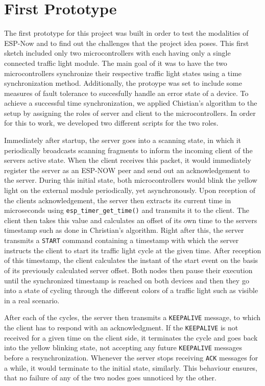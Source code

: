 \section{First Prototype}

The first prototype for this project was built in order to test the modalities of ESP-Now and to find out the challenges that the project idea poses. 
This first sketch included only two microcontrollers with each having only a single connected traffic light module. 
The main goal of it was to have the two microcontrollers synchronize their respective traffic light states using a time synchronization method.
Additionally, the protoype was set to include some measures of fault tolerance to succesfully handle an error state of a device. 
To achieve a successful time synchronization, we applied Chistian's algorithm to the setup by assigning the roles of server and client to the microcontrollers. 
In order for this to work, we developed two different scripts for the two roles. 

Immediately after startup, the server goes into a scanning state, in which it periodically broadcasts scanning fragments to inform the incoming client of the servers active state. 
When the client receives this packet, it would immediately register the server as an ESP-NOW peer and send out an acknowledgement to the server. 
During this initial state, both microcontrollers would blink the yellow light on the external module periodically, yet asynchronously.
Upon reception of the clients acknowledgement, the server then extracts its current time in microseconds using \texttt{esp\_timer\_get\_time()} and transmits it to the client.
The client then takes this value and calculates an offset of its own time to the servers timestamp such as done in Christian's algorithm. 
Right after this, the server transmits a \texttt{START} command containing a timestamp with which the server instructs the client to start its traffic light cycle at the given time. 
After reception of this timestamp, the client calculates the instant of the start event on the basis of its previously calculated server offset. 
Both nodes then pause their execution until the synchronized timestamp is reached on both devices and then they go into a state of cycling through the different colors of a traffic light such as visible in a real scenario. 

After each of the cycles, the server then transmits a \texttt{KEEPALIVE} message, to which the client has to respond with an acknowledgment. 
If the \texttt{KEEPALIVE} is not received for a given time on the client side, it terminates the cycle and goes back into the yellow blinking state, not accepting any future \texttt{KEEPALIVE} messages before a resynchronization.
Whenever the server stops receiving \texttt{ACK} messages for a while, it would terminate to the initial state, similarly. 
This behaviour ensures, that no failure of any of the two nodes goes unnoticed by the other.

